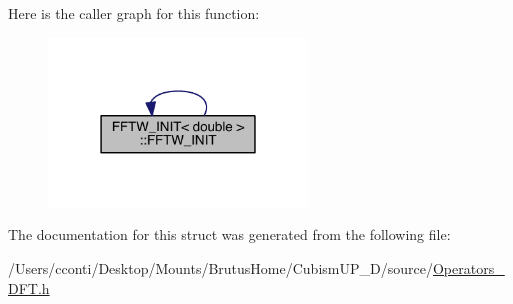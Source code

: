 Here is the caller graph for this function\+:\nopagebreak
\begin{figure}[H]
\begin{center}
\leavevmode
\includegraphics[width=195pt]{d6/dc2/struct_f_f_t_w___i_n_i_t_3_01double_01_4_ac70ec8b65ae3324527d4ee308ee7a7bd_icgraph}
\end{center}
\end{figure}




The documentation for this struct was generated from the following file\+:\begin{DoxyCompactItemize}
\item 
/\+Users/cconti/\+Desktop/\+Mounts/\+Brutus\+Home/\+Cubism\+U\+P\+\_\+D/source/\hyperlink{_operators___d_f_t_8h}{Operators\+\_\+\+D\+F\+T.\+h}\end{DoxyCompactItemize}
